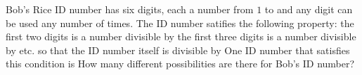 Bob’s Rice ID number has six digits, each a number from $1$ to  and any digit can be used any number of times. The ID number satifies the following property: the first two digits is a number divisible by  the first three digits is a number divisible by  etc. so that the ID number itself is divisible by  One ID number that satisfies this condition is  How many different possibilities are there for Bob’s ID number?